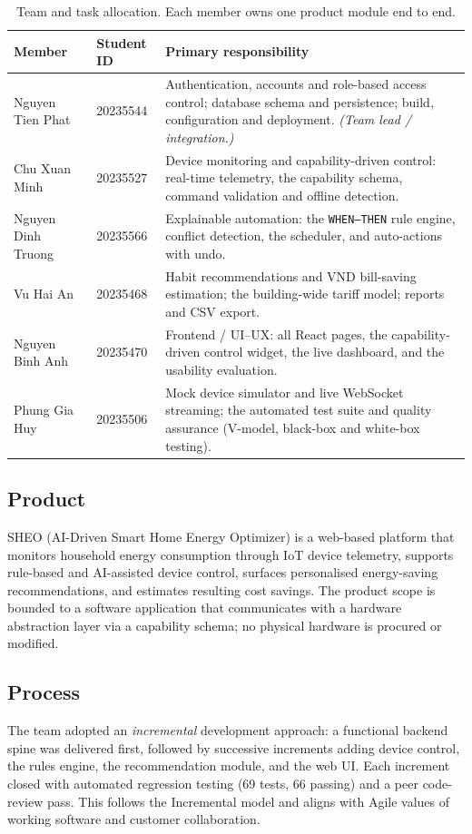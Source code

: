 \begin{table}[htbp]
\centering
\caption{Team and task allocation. Each member owns one product module end to end.}
\label{tab:task-alloc}
\small
\begin{tabularx}{\linewidth}{@{}l l Y@{}}
\toprule
\textbf{Member} & \textbf{Student ID} & \textbf{Primary responsibility} \\
\midrule
Nguyen Tien Phat & 20235544 & Authentication, accounts and role-based access control; database schema and persistence; build, configuration and deployment. \emph{(Team lead / integration.)} \\
Chu Xuan Minh & 20235527 & Device monitoring and capability-driven control: real-time telemetry, the capability schema, command validation and offline detection. \\
Nguyen Dinh Truong & 20235566 & Explainable automation: the \texttt{WHEN--THEN} rule engine, conflict detection, the scheduler, and auto-actions with undo. \\
Vu Hai An & 20235468 & Habit recommendations and VND bill-saving estimation; the building-wide tariff model; reports and CSV export. \\
Nguyen Binh Anh & 20235470 & Frontend / UI--UX: all React pages, the capability-driven control widget, the live dashboard, and the usability evaluation. \\
Phung Gia Huy & 20235506 & Mock device simulator and live WebSocket streaming; the automated test suite and quality assurance (V-model, black-box and white-box testing). \\
\bottomrule
\end{tabularx}
\end{table}

\subsection{Product}
SHEO (AI-Driven Smart Home Energy Optimizer) is a web-based platform that
monitors household energy consumption through IoT device telemetry, supports
rule-based and AI-assisted device control, surfaces personalised energy-saving
recommendations, and estimates resulting cost savings.  The product scope is
bounded to a software application that communicates with a hardware abstraction
layer via a capability schema; no physical hardware is procured or modified.

\subsection{Process}
The team adopted an \emph{incremental} development approach: a functional
backend spine was delivered first, followed by successive increments adding
device control, the rules engine, the recommendation module, and the web UI.
Each increment closed with automated regression testing (69 tests, 66 passing) and a
peer code-review pass.  This follows the Incremental model and
aligns with Agile values of working software and customer collaboration.

